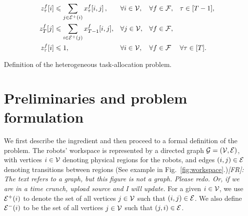 \documentclass[conference]{IEEEtran}
\newcommand{\frline}[2]{{\color{blue}#1}{\em \color{blue}[FR]: #2}}
\newcommand{\frline}[2]{#1}
\begin{document}
\begin{table}[!ht]
{\begin{minipage}[t]{1\textwidth - 2\fboxsep - 2\fboxrule}
\begin{subequations}
\begin{align}
          z^f_\tau[i] & \leqslant  \sum_{j\in \mathcal{E}^+(i)} x^f_\tau[i,j] \thinspace, & & \forall i \in \mathcal{V},  & &  \forall f\in\mathcal{F}, && \tau\in [T-1], \label{eq:bound_z_1} \\ 
          z^f_T[j] & \leqslant   \sum_{i\in \mathcal{E}^+(j)} x^f_{T-1}[i,j], & & \forall j \in \mathcal{V}, & &  \forall f\in\mathcal{F},  \label{eq:bound_z_2} \\ 
          z^f_\tau[i] & \leqslant 1 , && \forall i\in \mathcal{V}, && \forall f\in \mathcal{F} && \forall\tau\in [T]. \label{eq:bound_z_3}
        \end{align}
      \end{subequations}
    \end{minipage}}
\vspace{5pt}
\caption{Definition of the heterogeneous task-allocation problem.}
\label{tbl:heterogeneous}
\end{table}


\section{Preliminaries and problem formulation \label{sec:problem_statement}}
We first describe the ingredient and then proceed to a formal definition of the problem.
%
%
The robots' workspace is represented by a directed graph $\mathcal{G}=(\mathcal{V},\mathcal{E})$, with vertices $i\in \mathcal{V}$ denoting physical regions for the robots, and edges $(i,j)\in \mathcal{E}$ denoting transitions between regions \frline{(See example in Fig.~\ref{fig:workspace}.)}{The text refers to a graph, but this figure is not a graph. Please redo. Or, if we are in a time crunch, upload source and I will update.} For a given $i\in \mathcal{V}$, we use $\mathcal{E}^+(i)$ to denote the set of all vertices $j \in \mathcal{V}$ such that $(i,j)\in \mathcal{E}$. We also define $\mathcal{E}^-(i)$ to be the set of all vertices $j \in \mathcal{V}$ such that $(j,i)\in \mathcal{E}$.
\end{document}
